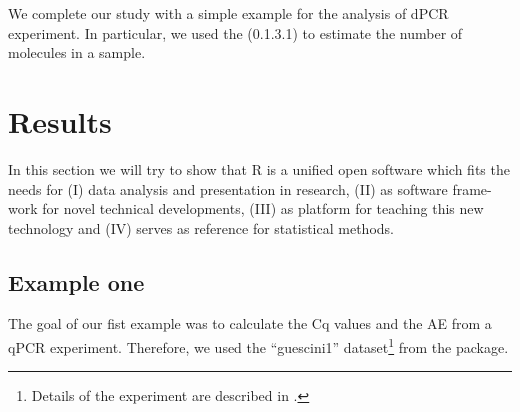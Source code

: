 We complete our study with a simple example for the analysis of dPCR experiment. 
In particular, we used the  (0.1.3.1) to estimate the number of 
molecules in a sample.

\section{Results}

In this section we will try to show that R is a unified open software which fits 
the needs for (I) data analysis and presentation in research, (II) as software 
frame-work for novel technical developments, (III) as platform for teaching this 
new technology and (IV) serves as reference for statistical methods.

\subsection{Example one}

The goal of our fist example was to calculate the Cq values and the AE from a 
qPCR experiment. Therefore, we used the ``guescini1'' dataset\footnote{Details 
of the experiment are described in \citet{guescini_2008}.} from the 
 package.


